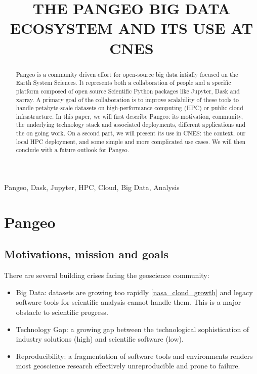 \documentclass{article}
\title{THE PANGEO BIG DATA ECOSYSTEM AND ITS USE AT CNES}
\begin{document}
%
\maketitle
%
\begin{abstract}
Pangeo\cite{b1} is a community driven effort for open-source big data intially focused on the Earth System Sciences. It represents both a collaboration of people and a specific platform composed of open source Scientific Python packages like Jupyter, Dask and xarray. A primary goal of the collaboration is to improve scalability of these tools to handle petabyte-scale datasets on high-performance computing (HPC) or public cloud infrastructure.
In this paper, we will first describe Pangeo: its motivation, community, the underlying technology stack and associated deployments, different applications and the on going work. On a second part, we will present its use in CNES: the context, our local HPC deployment, and some simple and more complicated use cases. We will then conclude with a future outlook for Pangeo.
\end{abstract}
%
\begin{keywords}
Pangeo, Dask, Jupyter, HPC, Cloud, Big Data, Analysis
\end{keywords}
%
\section{Pangeo}
\label{sec:pangeo}

\subsection{Motivations, mission and goals}
\label{ssec:motivations}

There are several building crises facing the geoscience community:

\begin{itemize}
\item Big Data: datasets are growing too rapidly \ref{nasa_cloud_growth} and legacy software tools for scientific analysis cannot handle them. This is a major obstacle to scientific progress.
\item Technology Gap: a growing gap between the technological sophistication of industry solutions (high) and scientific software (low).
\item Reproducibility: a fragmentation of software tools and environments renders most geoscience research effectively unreproducible and prone to failure.
\end{itemize}
\end{document}
